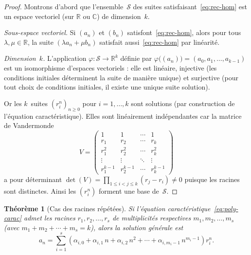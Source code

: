 \documentclass[12pt,a4paper,openany]{book}
\theoremstyle{definition}
\theoremstyle{plain}
\newtheorem{theoreme}[definition]{Théorème}
\theoremstyle{remark}
\newcommand{\R}{\mathbb{R}}
\newcommand{\C}{\mathbb{C}}
\begin{document}
\begin{proof}
Montrons d'abord que l'ensemble~$\mathcal{S}$ des suites satisfaisant~\eqref{eq:rec-hom}
est un espace vectoriel (sur $\R$ ou $\C$) de dimension~$k$.

\emph{Sous-espace vectoriel.} Si $(a_n)$ et $(b_n)$ satisfont~\eqref{eq:rec-hom},
alors pour tous $\lambda, \mu \in \R$, la suite $(\lambda a_n + \mu b_n)$
satisfait aussi~\eqref{eq:rec-hom} par linéarité.

\emph{Dimension~$k$.} L'application $\varphi \colon \mathcal{S} \to \R^k$ définie
par $\varphi\bigl((a_n)\bigr) = (a_0, a_1, \ldots, a_{k-1})$ est un isomorphisme
d'espaces vectoriels : elle est linéaire, injective (les conditions initiales
déterminent la suite de manière unique) et surjective (pour tout choix de
conditions initiales, il existe une unique suite solution).

Or les $k$~suites $(r_i^n)_{n \geq 0}$ pour $i = 1, \ldots, k$ sont solutions
(par construction de l'équation caractéristique). Elles sont linéairement
indépendantes car la matrice de Vandermonde
\[
  V = \begin{pmatrix}
    1 & 1 & \cdots & 1 \\
    r_1 & r_2 & \cdots & r_k \\
    r_1^2 & r_2^2 & \cdots & r_k^2 \\
    \vdots & \vdots & \ddots & \vdots \\
    r_1^{k-1} & r_2^{k-1} & \cdots & r_k^{k-1}
  \end{pmatrix}
\]
a pour déterminant $\det(V) = \prod_{1 \leq i < j \leq k}(r_j - r_i) \neq 0$
puisque les racines sont distinctes. Ainsi les $(r_i^n)$ forment une base
de~$\mathcal{S}$.
\end{proof}

\begin{theoreme}[Cas des racines répétées]
\label{thm:racines-repetees}
Si l'équation caractéristique~\eqref{eq:poly-carac} admet les racines
$r_1, r_2, \ldots, r_s$ de multiplicités respectives $m_1, m_2, \ldots, m_s$
(avec $m_1 + m_2 + \cdots + m_s = k$), alors la solution générale est
\[
  a_n = \sum_{i=1}^{s} \left( \alpha_{i,0} + \alpha_{i,1}\, n
    + \alpha_{i,2}\, n^2 + \cdots + \alpha_{i,m_i - 1}\, n^{m_i - 1} \right) r_i^n.
\]
\end{theoreme}
\end{document}
